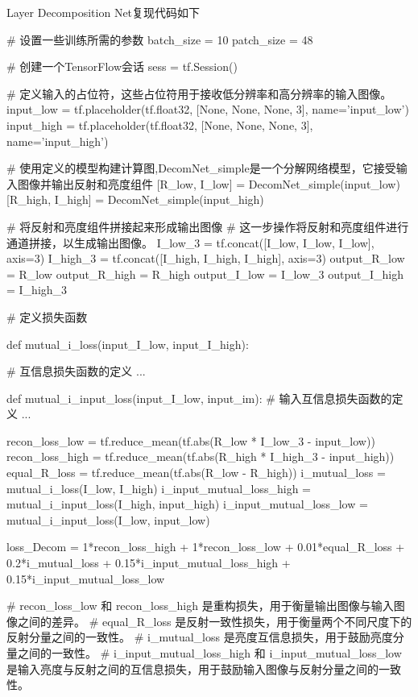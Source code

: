 \documentclass[letterpaper,12pt]{article}
\begin{document}
			Layer Decomposition Net复现代码如下
			\begin{python}
			# 设置一些训练所需的参数
			batch_size = 10
			patch_size = 48
				
			# 创建一个TensorFlow会话
			sess = tf.Session()
				
			# 定义输入的占位符，这些占位符用于接收低分辨率和高分辨率的输入图像。
			input_low = tf.placeholder(tf.float32, [None, None, None, 3], name='input_low')
			input_high = tf.placeholder(tf.float32, [None, None, None, 3], name='input_high')
				
			# 使用定义的模型构建计算图,DecomNet_simple是一个分解网络模型，它接受输入图像并输出反射和亮度组件
			[R_low, I_low] = DecomNet_simple(input_low)
			[R_high, I_high] = DecomNet_simple(input_high)
				
			# 将反射和亮度组件拼接起来形成输出图像
			# 这一步操作将反射和亮度组件进行通道拼接，以生成输出图像。
			I_low_3 = tf.concat([I_low, I_low, I_low], axis=3)
			I_high_3 = tf.concat([I_high, I_high, I_high], axis=3)
			output_R_low = R_low
			output_R_high = R_high
			output_I_low = I_low_3
			output_I_high = I_high_3
				
			# 定义损失函数
				
			def mutual_i_loss(input_I_low, input_I_high):
			
			# 互信息损失函数的定义
				...
				
			def mutual_i_input_loss(input_I_low, input_im):
			# 输入互信息损失函数的定义
			...
				
			recon_loss_low = tf.reduce_mean(tf.abs(R_low * I_low_3 - input_low))
			recon_loss_high = tf.reduce_mean(tf.abs(R_high * I_high_3 - input_high))
			equal_R_loss = tf.reduce_mean(tf.abs(R_low - R_high))
			i_mutual_loss = mutual_i_loss(I_low, I_high)
			i_input_mutual_loss_high = mutual_i_input_loss(I_high, input_high)
			i_input_mutual_loss_low = mutual_i_input_loss(I_low, input_low)
				
			loss_Decom = 1*recon_loss_high + 1*recon_loss_low + 0.01*equal_R_loss + 0.2*i_mutual_loss + 0.15*i_input_mutual_loss_high + 0.15*i_input_mutual_loss_low
				
			# recon_loss_low 和 recon_loss_high 是重构损失，用于衡量输出图像与输入图像之间的差异。
			# equal_R_loss 是反射一致性损失，用于衡量两个不同尺度下的反射分量之间的一致性。
			# i_mutual_loss 是亮度互信息损失，用于鼓励亮度分量之间的一致性。
			# i_input_mutual_loss_high 和 i_input_mutual_loss_low 是输入亮度与反射之间的互信息损失，用于鼓励输入图像与反射分量之间的一致性。
			\end{python}
			
\end{document}
